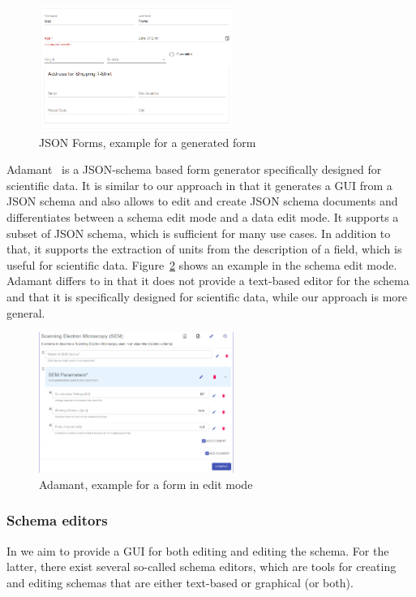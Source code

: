\begin{figure}[htb]
    \centering
    \includegraphics[width=2.5in]{figures/jsonforms}
    \caption{JSON Forms, example for a generated form}
    \label{fig:jsonforms}
\end{figure}

Adamant~\cite{siffa2022adamant} is a JSON-schema based form generator specifically designed for scientific data.
It is similar to our approach in that it generates a GUI from a JSON schema and also allows to edit and create JSON schema documents
and differentiates between a schema edit mode and a data edit mode.
It supports a subset of JSON schema, which is sufficient for many use cases.
In addition to that, it supports the extraction of units from the description of a field, which is useful for scientific data.
Figure~\ref{fig:adamant} shows an example in the schema edit mode.
Adamant differs to \toolname{} in that it does not provide a text-based editor for the schema and that it is specifically designed for scientific data,
while our approach is more general.

\begin{figure}[htb]
    \centering
    \includegraphics[width=2.5in]{figures/adamant}
    \caption{Adamant, example for a form in edit mode}
    \label{fig:adamant}
\end{figure}


\subsubsection{Schema editors}\label{subsubsec:schema-editors}
In \toolname{} we aim to provide a GUI for both editing \cfgfiles{} and editing the schema.
For the latter, there exist several so-called schema editors, which are tools for creating and editing schemas that are
either text-based or graphical (or both).

